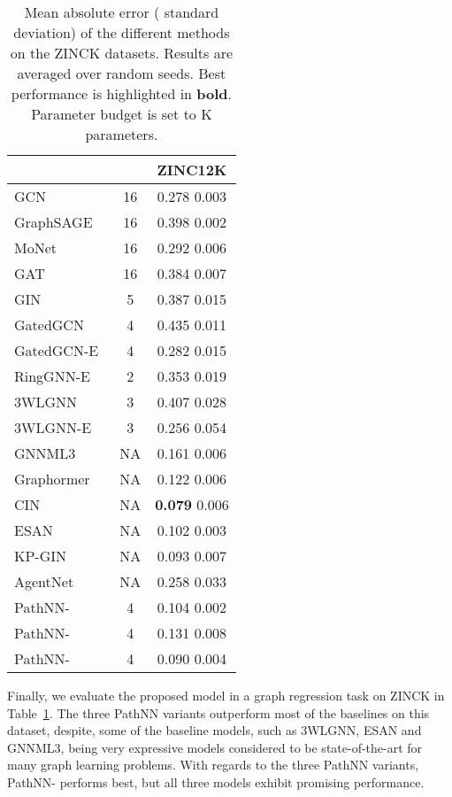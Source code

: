 \documentclass{article}
\theoremstyle{plain}
\theoremstyle{definition}
\theoremstyle{remark}
\begin{document}
\begin{table}[t]
\centering
\caption{Mean absolute error ( standard deviation) of the different methods on the ZINCK datasets. Results are averaged over  random seeds. Best performance is highlighted in \textbf{bold}. Parameter budget is set to K parameters.}
\label{tab:results_zinc}
\scriptsize
\renewcommand{\arraystretch}{1.2}
\begin{tabular}{l|cc}
\toprule
&  & \textbf{ZINC12K}  \\
\midrule
GCN~\cite{kipf2017semi} & 16 & 0.278  0.003 \\
GraphSAGE~\cite{hamilton2017inductive} & 16 & 0.398  0.002 \\
MoNet~\cite{monti2017geometric} & 16 & 0.292  0.006 \\
GAT~\cite{velivckovic2018graph} & 16 & 0.384  0.007 \\
GIN~\cite{xu2019powerful} & 5 & 0.387  0.015 \\
GatedGCN~\cite{bresson2017residual} & 4 & 0.435  0.011 \\
GatedGCN-E~\cite{bresson2017residual} & 4 & 0.282  0.015 \\
RingGNN-E~\cite{chen2019equivalence} & 2 & 0.353  0.019 \\
3WLGNN~\cite{maron2019provably} & 3 & 0.407  0.028 \\
3WLGNN-E~\cite{maron2019provably} & 3 & 0.256  0.054 \\  
GNNML3~\cite{balcilar2021breaking} & NA & 0.161  0.006 \\
Graphormer~\cite{ying2021transformers} & NA & 0.122  0.006 \\
CIN~\cite{bodnar2021weisfeiler2} & NA & \textbf{0.079}  0.006 \\ 	
ESAN~\cite{bevilacqua2022equivariant} & NA & 0.102  0.003 \\
KP-GIN~\cite{feng2022powerful} & NA & 0.093  0.007 \\
AgentNet~\cite{martinkus2023agent} & NA & 0.258  0.033 \\
\midrule
PathNN- & 4 & 0.104  0.002 \\
PathNN- & 4 & 0.131  0.008 \\
PathNN- & 4 & 0.090  0.004 \\
\bottomrule
\end{tabular}
\end{table}

Finally, we evaluate the proposed model in a graph regression task on ZINCK in Table~\ref{tab:results_zinc}.
The three PathNN variants outperform most of the baselines on this dataset, despite, some of the baseline models, such as 3WLGNN, ESAN and GNNML3, being very expressive models considered to be state-of-the-art for many graph learning problems. 
With regards to the three PathNN variants, PathNN- performs best, but all three models exhibit promising performance.
\end{document}
